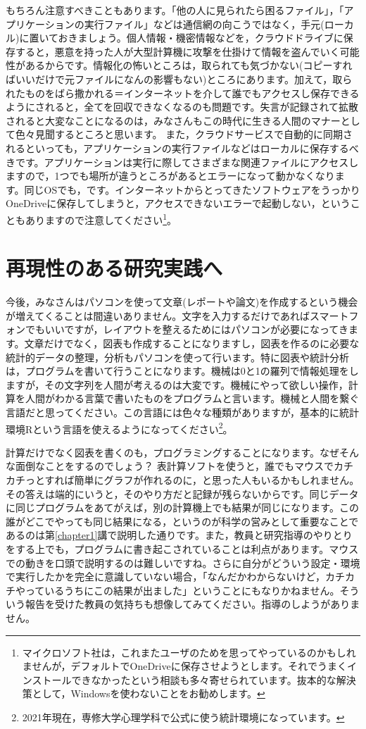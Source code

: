 \documentclass{ltjsbook}
\begin{document}
もちろん注意すべきこともあります。「他の人に見られたら困るファイル」，「アプリケーションの実行ファイル」などは通信網の向こうではなく，手元(ローカル)に置いておきましょう。個人情報・機密情報などを，クラウドドライブに保存すると，悪意を持った人が大型計算機に攻撃を仕掛けて情報を盗んでいく可能性があるからです。情報化の怖いところは，取られても気づかない(コピーすればいいだけで元ファイルになんの影響もない)ところにあります。加えて，取られたものをばら撒かれる＝インターネットを介して誰でもアクセスし保存できるようにされると，全てを回収できなくなるのも問題です。失言が記録されて拡散されると大変なことになるのは，みなさんもこの時代に生きる人間のマナーとして色々見聞するところと思います。
また，クラウドサービスで自動的に同期されるといっても，アプリケーションの実行ファイルなどはローカルに保存するべきです。アプリケーションは実行に際してさまざまな関連ファイルにアクセスしますので，1つでも場所が違うところがあるとエラーになって動かなくなります。同じOSでも，です。インターネットからとってきたソフトウェアをうっかりOneDriveに保存してしまうと，アクセスできないエラーで起動しない，ということもありますので注意してください\footnote{マイクロソフト社は，これまたユーザのためを思ってやっているのかもしれませんが，デフォルトでOneDriveに保存させようとします。それでうまくインストールできなかったという相談も多々寄せられています。抜本的な解決策として，Windowsを使わないことをお勧めします。}。

\section{再現性のある研究実践へ}
\label{reproducibility}

今後，みなさんはパソコンを使って文章(レポートや論文)を作成するという機会が増えてくることは間違いありません。文字を入力するだけであればスマートフォンでもいいですが，レイアウトを整えるためにはパソコンが必要になってきます。文章だけでなく，図表も作成することになりますし，図表を作るのに必要な統計的データの整理，分析もパソコンを使って行います。特に図表や統計分析は，プログラムを書いて行うことになります。機械は0と1の羅列で情報処理をしますが，その文字列を人間が考えるのは大変です。機械にやって欲しい操作，計算を人間がわかる言葉で書いたものをプログラムと言います。機械と人間を繋ぐ言語だと思ってください。この言語には色々な種類がありますが，基本的に統計環境Rという言語を使えるようになってください\footnote{2021年現在，専修大学心理学科で公式に使う統計環境になっています。}。

計算だけでなく図表を書くのも，プログラミングすることになります。なぜそんな面倒なことをするのでしょう？ 表計算ソフトを使うと，誰でもマウスでカチカチっとすれば簡単にグラフが作れるのに，と思った人もいるかもしれません。その答えは端的にいうと，そのやり方だと記録が残らないからです。同じデータに同じプログラムをあてがえば，別の計算機上でも結果が同じになります。この誰がどこでやっても同じ結果になる，というのが科学の営みとして重要なことであるのは第\ref{chapter1}講で説明した通りです。また，教員と研究指導のやりとりをする上でも，プログラムに書き起こされていることは利点があります。マウスでの動きを口頭で説明するのは難しいですね。さらに自分がどういう設定・環境で実行したかを完全に意識していない場合，「なんだかわからないけど，カチカチやっているうちにこの結果が出ました」ということにもなりかねません。そういう報告を受けた教員の気持ちも想像してみてください。指導のしようがありません。
\end{document}
